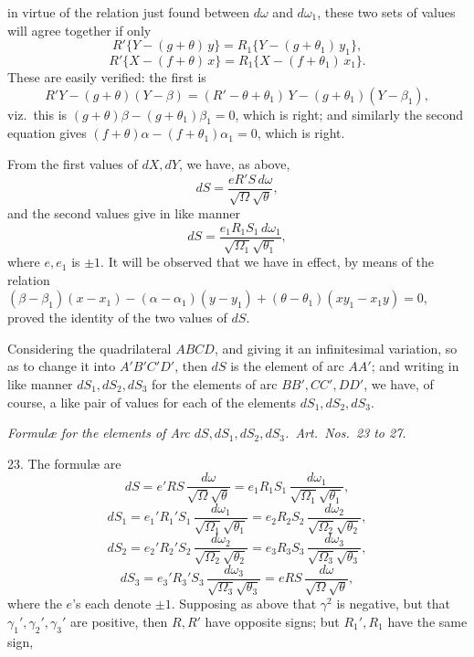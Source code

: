 \documentclass[11pt,a4paper]{article}
\begin{document}

\noindent in virtue of the relation just found between $d\omega$ and $d\omega_{1}$, these two sets of values will agree together if only
\[
R'\{Y - (g + \theta)\,y\} = R_{1}\{Y - (g + \theta_{1})\,y_{1}\},
\]
\[
R'\{X - (f + \theta)\,x\} = R_{1}\{X - (f + \theta_{1})\,x_{1}\}.
\]
These are easily verified: the first is
\[
R'Y - (g + \theta)(Y - \beta) = (R' - \theta + \theta_{1})\,Y - (g + \theta_{1})(Y - \beta_{1}),
\]
viz.\ this is $(g + \theta)\beta - (g + \theta_{1})\beta_{1} = 0$, which is right; and similarly the second equation gives $(f + \theta)\alpha - (f + \theta_{1})\alpha_{1} = 0$, which is right.

\medskip

From the first values of $dX, dY$, we have, as above,
\[
dS = \frac{eR'S\,d\omega}{\sqrt{\Omega}\sqrt{\theta}},
\]
and the second values give in like manner
\[
dS = \frac{e_{1}R_{1}S_{1}\,d\omega_{1}}{\sqrt{\Omega_{1}}\sqrt{\theta_{1}}},
\]
where $e, e_{1}$ is $\pm 1$. It will be observed that we have in effect, by means of the relation $(\beta - \beta_{1})(x - x_{1}) - (\alpha - \alpha_{1})(y - y_{1}) + (\theta - \theta_{1})(xy_{1} - x_{1}y) = 0$, proved the identity of the two values of $dS$.

\medskip

Considering the quadrilateral $ABCD$, and giving it an infinitesimal variation, so as to change it into $A'B'C'D'$, then $dS$ is the element of arc $AA'$; and writing in like manner $dS_{1}, dS_{2}, dS_{3}$ for the elements of arc $BB', CC', DD'$, we have, of course, a like pair of values for each of the elements $dS_{1}, dS_{2}, dS_{3}$.

\bigskip

\begin{center}
\emph{Formul\ae{} for the elements of Arc $dS, dS_{1}, dS_{2}, dS_{3}$.\ Art.\ Nos.\ 23 to 27.}
\end{center}

\medskip

23. The formul\ae{} are
\[
dS = e'RS\,\frac{d\omega}{\sqrt{\Omega}\sqrt{\theta}} = e_{1}R_{1}S_{1}\,\frac{d\omega_{1}}{\sqrt{\Omega_{1}}\sqrt{\theta_{1}}},
\]
\[
dS_{1} = e_{1}'R_{1}'S_{1}\,\frac{d\omega_{1}}{\sqrt{\Omega_{1}}\sqrt{\theta_{1}}} = e_{2}R_{2}S_{2}\,\frac{d\omega_{2}}{\sqrt{\Omega_{2}}\sqrt{\theta_{2}}},
\]
\[
dS_{2} = e_{2}'R_{2}'S_{2}\,\frac{d\omega_{2}}{\sqrt{\Omega_{2}}\sqrt{\theta_{2}}} = e_{3}R_{3}S_{3}\,\frac{d\omega_{3}}{\sqrt{\Omega_{3}}\sqrt{\theta_{3}}},
\]
\[
dS_{3} = e_{3}'R_{3}'S_{3}\,\frac{d\omega_{3}}{\sqrt{\Omega_{3}}\sqrt{\theta_{3}}} = eRS\,\frac{d\omega}{\sqrt{\Omega}\sqrt{\theta}},
\]
where the $e$'s each denote $\pm 1$. Supposing as above that $\gamma^{2}$ is negative, but that $\gamma_{1}', \gamma_{2}', \gamma_{3}'$ are positive, then $R, R'$ have opposite signs; but $R_{1}', R_{1}$ have the same sign,
\end{document}
